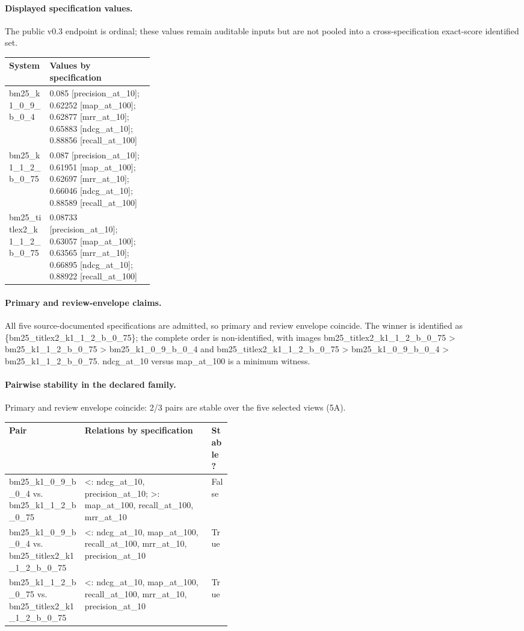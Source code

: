 \paragraph{Displayed specification values.} The public v0.3 endpoint is ordinal; these values remain auditable inputs but are not pooled into a cross-specification exact-score identified set.
\begingroup\scriptsize
\begin{tabularx}{\linewidth}{@{}p{0.28\linewidth}X@{}}
\toprule System & Values by specification \\
\midrule
bm25\_k1\_0\_9\_b\_0\_4 & 0.085 [precision\_at\_10]; 0.62252 [map\_at\_100]; 0.62877 [mrr\_at\_10]; 0.65883 [ndcg\_at\_10]; 0.88856 [recall\_at\_100] \\
bm25\_k1\_1\_2\_b\_0\_75 & 0.087 [precision\_at\_10]; 0.61951 [map\_at\_100]; 0.62697 [mrr\_at\_10]; 0.66046 [ndcg\_at\_10]; 0.88589 [recall\_at\_100] \\
bm25\_titlex2\_k1\_1\_2\_b\_0\_75 & 0.08733 [precision\_at\_10]; 0.63057 [map\_at\_100]; 0.63565 [mrr\_at\_10]; 0.66895 [ndcg\_at\_10]; 0.88922 [recall\_at\_100] \\
\bottomrule\end{tabularx}\endgroup

\paragraph{Primary and review-envelope claims.} All five source-documented specifications are admitted, so primary and review envelope coincide.  The winner is identified as \{bm25\_titlex2\_k1\_1\_2\_b\_0\_75\}; the complete order is non-identified, with images bm25\_titlex2\_k1\_1\_2\_b\_0\_75  >  bm25\_k1\_1\_2\_b\_0\_75  >  bm25\_k1\_0\_9\_b\_0\_4 and bm25\_titlex2\_k1\_1\_2\_b\_0\_75  >  bm25\_k1\_0\_9\_b\_0\_4  >  bm25\_k1\_1\_2\_b\_0\_75.  ndcg\_at\_10 versus map\_at\_100 is a minimum witness.

\paragraph{Pairwise stability in the declared family.} Primary and review envelope coincide: 2/3 pairs are stable over the five selected views (5A).
\begingroup\scriptsize
\begin{tabularx}{\linewidth}{@{}p{0.34\linewidth}Xp{0.09\linewidth}@{}}
\toprule Pair & Relations by specification & Stable? \\
\midrule
bm25\_k1\_0\_9\_b\_0\_4 vs. bm25\_k1\_1\_2\_b\_0\_75 & <: ndcg\_at\_10, precision\_at\_10; >: map\_at\_100, recall\_at\_100, mrr\_at\_10 & False \\
bm25\_k1\_0\_9\_b\_0\_4 vs. bm25\_titlex2\_k1\_1\_2\_b\_0\_75 & <: ndcg\_at\_10, map\_at\_100, recall\_at\_100, mrr\_at\_10, precision\_at\_10 & True \\
bm25\_k1\_1\_2\_b\_0\_75 vs. bm25\_titlex2\_k1\_1\_2\_b\_0\_75 & <: ndcg\_at\_10, map\_at\_100, recall\_at\_100, mrr\_at\_10, precision\_at\_10 & True \\
\bottomrule\end{tabularx}\endgroup

